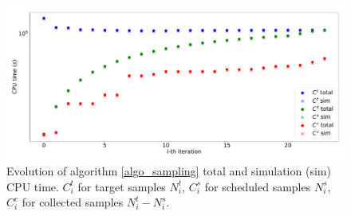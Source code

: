 \documentclass{article}
\begin{document}
\begin{figure}[H]
\centering
\includegraphics[width=\textwidth]{sampling_log.pdf}
\caption{Evolution of algorithm \ref{algo_sampling} total and simulation (sim) CPU time. $C^t_{i}$ for target samples $N^t_{i}$, $C^s_{i}$ for scheduled samples $N^s_{i}$, $C^c_{i}$ for collected samples $N^t_{i} - N^s_{i}$.}
\label{fig:n_l_time}
\end{figure}


\end{document}
